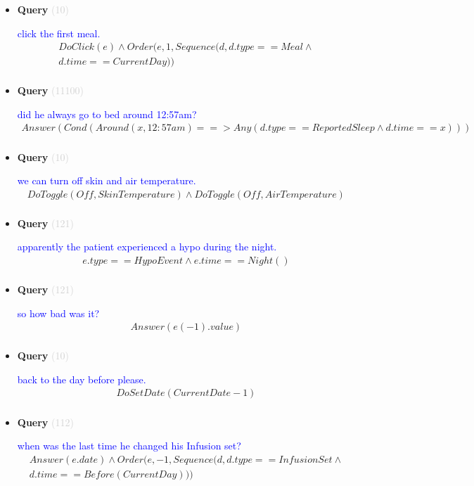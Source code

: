 \documentclass[11pt]{article}
\newcommand{\key}[1]{\textcolor{lightgray}{#1}}
\newcounter{CQuery}
\begin{document}
\begin{itemize}
\item
\textbf{Query\theCQuery} \key{(10)} \addtocounter{CQuery}{1}
\textcolor{blue}{ click the first meal. }
\begin{multline*}
DoClick(e) \wedge  Order(e, 1, Sequence(d, d.type==Meal \wedge \\ 
d.time==CurrentDay)) \\ 
\end{multline*}


\item
\textbf{Query\theCQuery} \key{(11100)} \addtocounter{CQuery}{1}
\textcolor{blue}{ did he always go to bed around 12:57am? }
\begin{multline*}
Answer(Cond(Around(x, 12:57am) ==> Any(d.type==ReportedSleep \wedge d.time==x))) \\ 
\end{multline*}


\item
\textbf{Query\theCQuery} \key{(10)} \addtocounter{CQuery}{1}
\textcolor{blue}{ we can turn off skin and air temperature. }
\begin{multline*}
DoToggle(Off, SkinTemperature) \wedge DoToggle(Off, AirTemperature) \\ 
\end{multline*}


\item
\textbf{Query\theCQuery} \key{(121)} \addtocounter{CQuery}{1}
\textcolor{blue}{ apparently the patient experienced a hypo during the night. }
\begin{multline*}
e.type==HypoEvent \wedge e.time==Night() \\ 
\end{multline*}


\item
\textbf{Query\theCQuery} \key{(121)} \addtocounter{CQuery}{1}
\textcolor{blue}{ so how bad was it? }
\begin{multline*}
Answer(e(-1).value) \\ 
\end{multline*}


\item
\textbf{Query\theCQuery} \key{(10)} \addtocounter{CQuery}{1}
\textcolor{blue}{ back to the day before please. }
\begin{multline*}
DoSetDate(CurrentDate - 1) \\ 
\end{multline*}


\item
\textbf{Query\theCQuery} \key{(112)} \addtocounter{CQuery}{1}
\textcolor{blue}{ when was the last time he changed his Infusion set? }
\begin{multline*}
Answer(e.date) \wedge Order(e, -1, Sequence(d, d.type==InfusionSet\wedge \\ 
d.time==Before(CurrentDay))) \\ 
\end{multline*}



\end{itemize}
\end{document}
